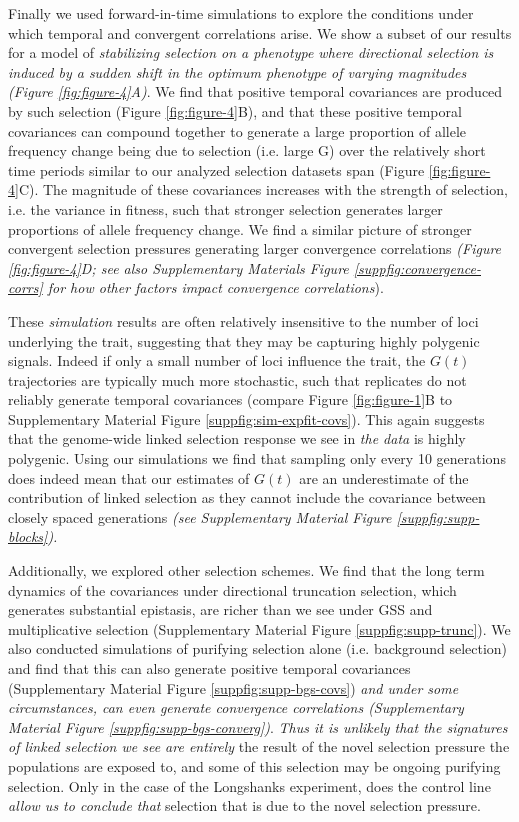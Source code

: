 \documentclass[11pt]{article}
\newcommand{\vb}[1]{{\it \color{blue} #1}}
\begin{document}
Finally we used forward-in-time simulations to explore the conditions under
which temporal and convergent correlations arise. We show a subset of our
results for a model of \vb{stabilizing selection on a phenotype where
  directional selection is induced by a sudden shift in the optimum phenotype
of varying magnitudes (Figure \ref{fig:figure-4}A)}. We find that positive
temporal covariances are produced by such selection (Figure
\ref{fig:figure-4}B), and that these positive temporal covariances can compound
together to generate a large proportion of allele frequency change being due to
selection (i.e. large G) over the relatively short time periods similar to our
analyzed selection datasets span (Figure \ref{fig:figure-4}C).  The magnitude
of these covariances increases with the strength of selection, i.e. the
variance in fitness, such that stronger selection generates larger proportions
of allele frequency change.  We find a similar picture of stronger convergent
selection pressures generating larger convergence correlations \vb{(Figure
  \ref{fig:figure-4}D; see also Supplementary Materials Figure
\ref{suppfig:convergence-corrs} for how other factors impact convergence
correlations}). 

These \vb{simulation} results are often relatively insensitive to the number of
loci underlying the trait, suggesting that they may be capturing highly
polygenic signals.  Indeed if only a small number of loci influence the trait,
the $G(t)$ trajectories are typically much more stochastic, such that
replicates do not reliably generate temporal covariances (compare Figure
\ref{fig:figure-1}B to Supplementary Material Figure
\ref{suppfig:sim-expfit-covs}). This again suggests that the genome-wide linked
selection response we see in \vb{the \textcite{Barghi2019-qy} data} is highly
polygenic.  Using our simulations we find that sampling only every 10
generations does indeed mean that our estimates of $G(t)$ are an underestimate
of the contribution of linked selection as they cannot include the covariance
between closely spaced generations \vb{(see Supplementary Material Figure
\ref{suppfig:supp-blocks}).}

Additionally, we explored other selection schemes. We find that the long term
dynamics of the covariances under directional truncation selection, which
generates substantial epistasis, are richer than we see under GSS and
multiplicative selection (Supplementary Material Figure
\ref{suppfig:supp-trunc}).  We also conducted simulations of purifying
selection alone (i.e. background selection) and find that this can also
generate positive temporal covariances (Supplementary Material Figure
\ref{suppfig:supp-bgs-covs}) \vb{and under some circumstances, can even
  generate convergence correlations (Supplementary Material Figure
  \ref{suppfig:supp-bgs-converg})}.  \vb{Thus it is unlikely that the
signatures of linked selection we see are entirely} the result of the novel
selection pressure the populations are exposed to, and some of this selection
may be ongoing purifying selection. Only in the case of the Longshanks
experiment, does the control line \vb{allow us to conclude that} selection
that is due to the novel selection pressure.
\end{document}
